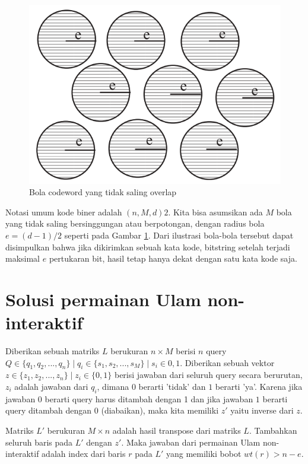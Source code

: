 \documentclass[conference,compsoc]{IEEEtran}
\begin{document}
\begin{figure}
\centering
\includegraphics[width=\linewidth]{../img/codewordsball.png}
\caption{Bola codeword yang tidak saling overlap}
\label{fig:codewordsball}
\end{figure}

Notasi umum kode biner adalah $(n,M,d)2$. Kita bisa asumsikan ada $M$ bola yang tidak saling bersinggungan atau berpotongan, dengan radius bola $e=(d-1)/2$ seperti pada Gambar \ref{fig:codewordsball}. Dari ilustrasi bola-bola tersebut dapat disimpulkan bahwa jika dikirimkan sebuah kata kode, bitstring setelah terjadi maksimal $e$ pertukaran bit, hasil tetap hanya dekat dengan satu kata kode saja.


\section{Solusi permainan Ulam non-interaktif}

Diberikan sebuah matriks $L$ berukuran $n \times M$ berisi $n$ query $Q \in \{q_1,q_2,...,q_n\} \mid q_i \in \{s_1,s_2,...,s_M\} \mid s_i \in {0,1}$. Diberikan sebuah vektor $z \in \{z_1,z_2,...,z_n\} \mid z_i \in \{0,1\}$ berisi jawaban dari seluruh query secara berurutan, $z_i$ adalah jawaban dari $q_i$, dimana $0$ berarti 'tidak' dan $1$ berarti 'ya'. Karena jika jawaban $0$ berarti query harus ditambah dengan 1 dan jika jawaban $1$ berarti query ditambah dengan 0 (diabaikan), maka kita memiliki $z'$ yaitu inverse dari $z$. 

Matriks $L'$ berukuran $M \times n$ adalah hasil transpose dari matriks $L$. Tambahkan seluruh baris pada $L'$ dengan $z'$. Maka jawaban dari permainan Ulam non-interaktif adalah index dari baris $r$ pada $L'$ yang memiliki bobot $wt(r) > n-e$.
\end{document}
